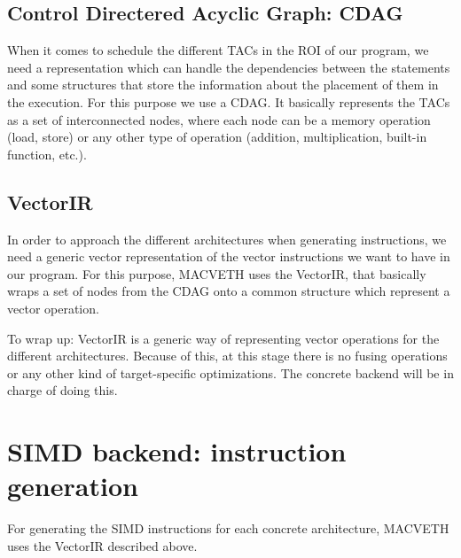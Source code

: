 \documentclass[a4paper,12pt]{memoir}
\begin{document}
\section{Control Directered Acyclic Graph: CDAG}
When it comes to schedule the different TACs in the ROI of our program, we need
a representation which can handle the dependencies between the statements and
some structures that store the information about the placement of them in the
execution. For this purpose we use a CDAG. It basically represents the TACs as a
set of interconnected nodes, where each node can be a memory operation (load,
store) or any other type of operation (addition, multiplication, built-in
function, etc.).

\section{VectorIR}
In order to approach the different architectures when generating instructions,
we need a generic vector representation of the vector instructions we want to
have in our program. For this purpose, MACVETH uses the VectorIR, that basically
wraps a set of nodes from the CDAG onto a common structure which represent a vector operation.

To wrap up: VectorIR is a generic way of representing vector operations for the different
architectures. Because of this, at this stage there is no fusing operations or
any other kind of target-specific optimizations. The concrete backend will be in
charge of doing this.

\chapter*{SIMD backend: instruction generation}
For generating the SIMD instructions for each concrete architecture, MACVETH
uses the VectorIR described above.
\end{document}
